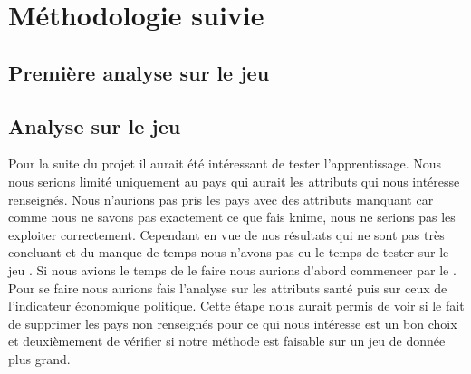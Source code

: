 \section{Méthodologie suivie}

\subsection{Première analyse sur le jeu \jeuc}

\subsection{Analyse sur le jeu \jeua}
Pour la suite du projet il aurait été intéressant de tester l'apprentissage. Nous nous serions limité uniquement au pays qui aurait les attributs qui nous intéresse renseignés. Nous n'aurions pas pris les pays avec des attributs manquant car comme nous ne savons pas exactement ce que fais knime, nous ne serions pas les exploiter correctement. Cependant en vue de nos résultats qui ne sont pas très concluant et du manque de temps nous n'avons pas eu le temps de tester sur le jeu \jeua . Si nous avions le temps de le faire nous aurions d'abord commencer par le \jeub . Pour se faire nous aurions fais l'analyse sur les attributs santé puis sur ceux de l'indicateur économique politique. Cette étape nous aurait permis de voir si le fait de supprimer les pays non renseignés pour ce qui nous intéresse est un bon choix et deuxièmement de vérifier si notre méthode est faisable sur un jeu de donnée plus grand.


